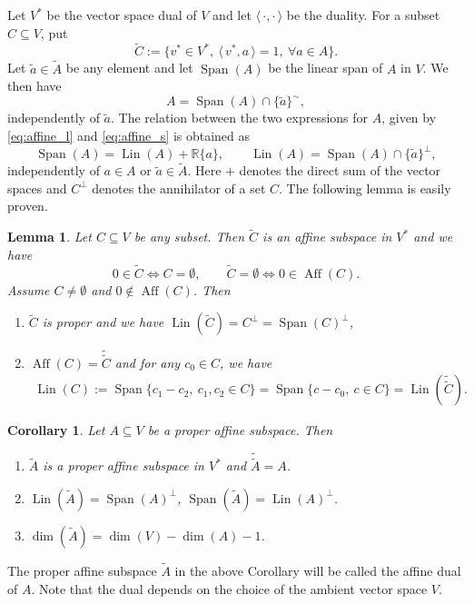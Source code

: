 \documentclass[12pt]{article}
\newtheorem{lemma}{Lemma}
\newtheorem{coro}{Corollary}
\theoremstyle{definition}
\theoremstyle{remark}
\def\aff{\operatorname{Aff}}
\def\lin{\operatorname{Lin}}
\def\Span{\operatorname{Span}}
\def\<{\langle\,}
\def\>{\,\rangle}
\begin{document}
Let $V^*$ be the vector space dual of $V$ and let $\<\cdot,\cdot\>$ be the
duality. For a subset $C\subseteq V$, put
\[
\tilde C:=\{v^*\in V^*,\ \<v^*,a\>=1,\ \forall a\in A\}.
\]
Let $\tilde a\in \tilde A$ be any element and let $\Span(A)$ be the linear span of $A$ in
$V$. We then have
\begin{equation}\label{eq:affine_s}
A=\Span(A)\cap \{\tilde a\}^\sim,
\end{equation}
independently of $\tilde a$. The relation between the two expressions for $A$, given by
\eqref{eq:affine_l} and \eqref{eq:affine_s} is obtained as
\begin{equation}\label{eq:LandS}
\Span(A)=\lin(A)+\mathbb R\{a\},\qquad \lin(A)=\Span(A)\cap \{\tilde a\}^\perp,
\end{equation}
independently of $a\in A$ or $\tilde a\in \tilde A$. Here $+$ denotes the direct sum of
the vector spaces and $C^\perp$ denotes the annihilator of a set $C$.
The following lemma is  easily proven.

\begin{lemma}\label{lemma:dual} Let $C\subseteq V$ be any subset. Then $\tilde C$ is an affine subspace in 
$V^*$ and we have
\[
0\in \tilde C \iff C= \emptyset, \qquad \tilde C=\emptyset\iff 0\in \aff(C).
\]
Assume $C\ne \emptyset$ and $0\notin \aff(C)$. Then
\begin{enumerate}
\item[(i)] $\tilde C$ is proper and we have $\lin(\tilde C)=C^\perp=\Span(C)^\perp$,
\item[(ii)] $\aff(C)=\tilde{\tilde C}$ and for any $c_0\in
C$, we have
\begin{align*}
\lin(C):= \Span\{c_1-c_2,\ c_1,c_2\in C\}=\Span\{c-c_0,\ c\in C\}=\lin(\tilde{\tilde C}).
\end{align*}

\end{enumerate}


\end{lemma}

\begin{coro}\label{coro:dual} Let $A\subseteq V$ be a proper affine subspace. Then 
\begin{enumerate}
\item[(i)] $\tilde A$ is a proper affine subspace in $V^*$ and $\tilde{\tilde A}=A$.
\item[(ii)] $\lin(\tilde A)=\Span(A)^\perp$, $\Span(\tilde A)=\lin(A)^\perp$.
\item[(iii)] $\dim(\tilde A)=\dim(V)-\dim(A)-1$.
\end{enumerate}


\end{coro}

The proper affine subspace $\tilde A$ in the above Corollary will be called the affine dual
of $A$. Note that the dual depends on the choice of the ambient vector space $V$.
\end{document}
